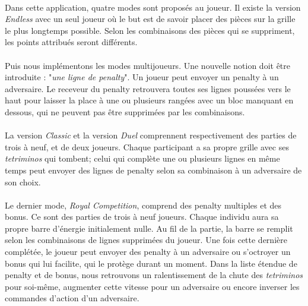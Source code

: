 \documentclass{article}
\begin{document}
\paragraph*{}

Dans cette application, quatre modes sont proposés au joueur. Il existe la version \textit{Endless} avec un seul joueur où le but est de savoir placer des pièces sur la grille le plus longtemps possible. Selon les combinaisons des pièces qui se suppriment, les points attribués seront différents.
 
\paragraph*{}

Puis nous implémentons les modes multijoueurs. Une nouvelle notion doit être introduite : "\textit{une ligne de penalty}". Un joueur peut envoyer un penalty à un adversaire. Le receveur du penalty retrouvera toutes ses lignes poussées vers le haut pour laisser la place à une ou plusieurs rangées avec un bloc manquant en dessous, qui ne peuvent pas être supprimées par les combinaisons.  

\paragraph*{}

La version \textit{Classic} et la version \textit{Duel} comprennent respectivement des parties de trois à neuf, et de deux joueurs. Chaque participant a sa propre grille avec ses \textit{tetriminos} qui tombent; celui qui complète une ou plusieurs lignes en même temps peut envoyer des lignes de penalty selon sa combinaison à un adversaire de son choix. 

\paragraph*{}

Le dernier mode, \textit{ Royal Competition}, comprend des penalty multiples et des bonus. Ce sont des parties de trois à neuf joueurs. Chaque individu aura sa propre barre d'énergie initialement nulle. Au fil de la partie, la barre se remplit selon les combinaisons de lignes supprimées du joueur. Une fois cette dernière complétée, le joueur peut envoyer des penalty à un adversaire ou s'octroyer un bonus qui lui facilite, qui le protège durant un moment. Dans la liste étendue de penalty et de bonus, nous retrouvons un ralentissement de la chute des \textit{tetriminos} pour soi-même, augmenter cette vitesse pour un adversaire ou encore inverser les commandes d'action d'un adversaire.
\end{document}
